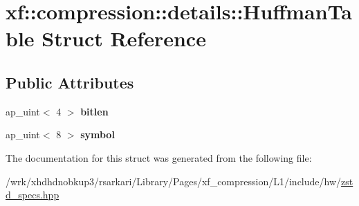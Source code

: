 \hypertarget{structxf_1_1compression_1_1details_1_1HuffmanTable}{\section{xf\-:\-:compression\-:\-:details\-:\-:Huffman\-Table Struct Reference}
\label{structxf_1_1compression_1_1details_1_1HuffmanTable}
}
\subsection*{Public Attributes}
\begin{DoxyCompactItemize}
\item 
\hypertarget{structxf_1_1compression_1_1details_1_1HuffmanTable_aacb5ca2feeb278e5ea4e143d63612beb}{ap\-\_\-uint$<$ 4 $>$ {\bfseries bitlen}}\label{structxf_1_1compression_1_1details_1_1HuffmanTable_aacb5ca2feeb278e5ea4e143d63612beb}

\item 
\hypertarget{structxf_1_1compression_1_1details_1_1HuffmanTable_adac0932855f14f60ce604f2066670fea}{ap\-\_\-uint$<$ 8 $>$ {\bfseries symbol}}\label{structxf_1_1compression_1_1details_1_1HuffmanTable_adac0932855f14f60ce604f2066670fea}

\end{DoxyCompactItemize}


The documentation for this struct was generated from the following file\-:\begin{DoxyCompactItemize}
\item 
/wrk/xhdhdnobkup3/rsarkari/\-Library/\-Pages/xf\-\_\-compression/\-L1/include/hw/\hyperlink{zstd__specs_8hpp}{zstd\-\_\-specs.\-hpp}\end{DoxyCompactItemize}
